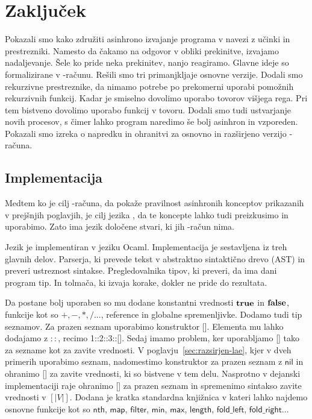 \section{Zaključek}

Pokazali smo kako združiti asinhrono izvajanje programa v navezi z učinki in prestrezniki.
Namesto da čakamo na odgovor v obliki prekinitve, izvajamo nadaljevanje.
Šele ko pride neka prekinitev, nanjo reagiramo.
Glavne ideje so formalizirane v \lae-računu.
Rešili smo tri primanjkljaje osnovne verzije.
Dodali smo rekurzivne prestreznike, da nimamo potrebe po prekomerni uporabi pomožnih rekurzivnih funkcij.
Kadar je smiselno dovolimo uporabo tovorov višjega rega.
Pri tem bistveno dovolimo uporabo funkcij v tovoru.
Dodali smo tudi ustvarjanje novih procesov, s čimer lahko program naredimo še bolj asinhron in vzporeden.
Pokazali smo izreka o napredku in ohranitvi za osnovno in razširjeno verzijo \lae-računa.

\subsection{Implementacija}\label{sec:implementacija}

Medtem ko je cilj \lae-računa, da pokaže pravilnost asinhronih konceptov prikazanih v prejšnjih poglavjih, je cilj jezika \aeff{}, da te koncepte lahko tudi preizkusimo in uporabimo. Zato ima jezik \aeff{} določene stvari, ki jih \lae-račun nima.

Jezik \aeff{} je implementiran v jeziku Ocaml. Implementacija je sestavljena iz treh glavnih delov.
Parserja, ki prevede tekst v abstraktno sintaktično drevo (AST) in preveri ustreznost sintakse.  
Pregledovalnika tipov, ki preveri, da ima dani program tip.
In tolmača, ki izvaja korake, dokler ne pride do rezultata.


Da \aeff{} postane bolj uporaben so mu dodane konstantni vrednosti $\mathbf{true}$ in $\mathbf{false}$, funkcije kot so $+, -, *, / ...$, reference in globalne spremenljivke.
Dodamo tudi tip seznamov. Za prazen seznam uporabimo konstruktor []. Elementa mu lahko dodajamo z $::$, recimo 1::2::3::[].
Sedaj imamo problem, ker uporabljamo [] tako za sezname kot za zavite vrednosti.
V poglavju~\ref{sec:razsirjen-lae}, kjer v dveh primerih uporabimo seznam, nadomestimo konstruktor za prazen seznam z $\mathsf{nil}$ in ohranimo [] za zavite vrednosti, ki so bistvene v tem delu.
Nasprotno v dejanski implementaciji \aeff{} raje ohranimo [] za prazen seznam in spremenimo sintakso zavite vrednosti v $[|V|]$. 
Dodana je kratka standardna knjižnica v kateri lahko najdemo osnovne funkcije kot so $\mathsf{nth}$, $\mathsf{map}$, $\mathsf{filter}$, $\mathsf{min}$, $\mathsf{max}$, $\mathsf{length}$, $\mathsf{fold\_left}$, $\mathsf{fold\_right}$...

